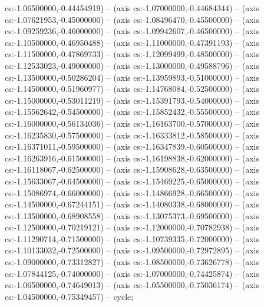 cs:-1.06500000,-0.44454919) -- (axis cs:-1.07000000,-0.44684344) -- (axis cs:-1.07621953,-0.45000000) -- (axis cs:-1.08496470,-0.45500000) -- (axis cs:-1.09259236,-0.46000000) -- (axis cs:-1.09942607,-0.46500000) -- (axis cs:-1.10500000,-0.46950488) -- (axis cs:-1.11000000,-0.47391193) -- (axis cs:-1.11500000,-0.47869733) -- (axis cs:-1.12099499,-0.48500000) -- (axis cs:-1.12533023,-0.49000000) -- (axis cs:-1.13000000,-0.49588796) -- (axis cs:-1.13500000,-0.50286204) -- (axis cs:-1.13959893,-0.51000000) -- (axis cs:-1.14500000,-0.51960977) -- (axis cs:-1.14768084,-0.52500000) -- (axis cs:-1.15000000,-0.53011219) -- (axis cs:-1.15391793,-0.54000000) -- (axis cs:-1.15562642,-0.54500000) -- (axis cs:-1.15852432,-0.55500000) -- (axis cs:-1.16000000,-0.56134036) -- (axis cs:-1.16163700,-0.57000000) -- (axis cs:-1.16235830,-0.57500000) -- (axis cs:-1.16333812,-0.58500000) -- (axis cs:-1.16371011,-0.59500000) -- (axis cs:-1.16347839,-0.60500000) -- (axis cs:-1.16263916,-0.61500000) -- (axis cs:-1.16198838,-0.62000000) -- (axis cs:-1.16118067,-0.62500000) -- (axis cs:-1.15908628,-0.63500000) -- (axis cs:-1.15633067,-0.64500000) -- (axis cs:-1.15469225,-0.65000000) -- (axis cs:-1.15086974,-0.66000000) -- (axis cs:-1.14866928,-0.66500000) -- (axis cs:-1.14500000,-0.67244151) -- (axis cs:-1.14080338,-0.68000000) -- (axis cs:-1.13500000,-0.68908558) -- (axis cs:-1.13075373,-0.69500000) -- (axis cs:-1.12500000,-0.70219121) -- (axis cs:-1.12000000,-0.70782938) -- (axis cs:-1.11290714,-0.71500000) -- (axis cs:-1.10739335,-0.72000000) -- (axis cs:-1.10133032,-0.72500000) -- (axis cs:-1.09500000,-0.72972895) -- (axis cs:-1.09000000,-0.73312827) -- (axis cs:-1.08500000,-0.73626778) -- (axis cs:-1.07844125,-0.74000000) -- (axis cs:-1.07000000,-0.74425874) -- (axis cs:-1.06500000,-0.74649013) -- (axis cs:-1.05500000,-0.75036174) -- (axis cs:-1.04500000,-0.75349457) -- cycle;

